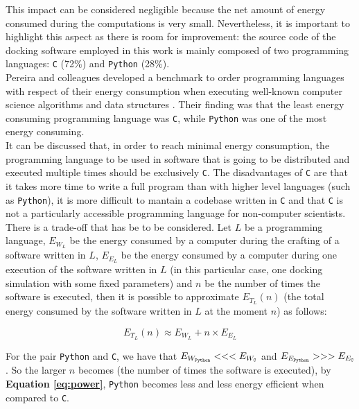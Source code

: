 This impact can be considered negligible because the net amount of energy consumed during the computations is very small. Nevertheless, it is important to highlight this aspect as there is room for improvement: the source code of the docking software employed in this work is mainly composed of two programming languages: \texttt{C} (72\%) and \texttt{Python} (28\%).\\

Pereira and colleagues developed a benchmark to order programming languages with respect of their energy consumption when executing well-known computer science algorithms and data structures \cite{pereira_2017}. Their finding was that the least energy consuming programming language was \texttt{C}, while \texttt{Python} was one of the most energy consuming.\\

It can be discussed that, in order to reach minimal energy consumption, the programming language to be used in software that is going to be distributed and executed multiple times should be exclusively \texttt{C}. The disadvantages of \texttt{C} are that it takes more time to write a full program than with higher level languages (such as \texttt{Python}), it is more difficult to mantain a codebase written in \texttt{C} and that \texttt{C} is not a particularly accessible programming language for non-computer scientists.\\

There is a trade-off that has be to be considered. Let $L$ be a programming language, $E_{W_L}$ be the energy consumed by a computer during the crafting of a software written in $L$, $E_{E_L}$ be the energy consumed by a computer during one execution of the software written in $L$ (in this particular case, one docking simulation with some fixed parameters) and $n$ be the number of times the software is executed, then it is possible to approximate $E_{T_L}(n)$ (the total energy consumed by the software written in $L$ at the moment $n$) as follows:

\begin{equation}
    \label{eq:power}
    E_{T_L}(n)\approx E_{W_L} + n\times E_{E_L}         
\end{equation}

For the pair \texttt{Python} and \texttt{C}, we have that $E_{W_\text{\texttt{Python}}} <<< E_{W_\text{\texttt{C}}}$ and $E_{E_\text{\texttt{Python}}} >>> E_{E_\text{\texttt{C}}}$. So the larger $n$ becomes (the number of times the software is executed), by \textbf{Equation \ref{eq:power}}, \texttt{Python} becomes less and less energy efficient when compared to \texttt{C}.\\

